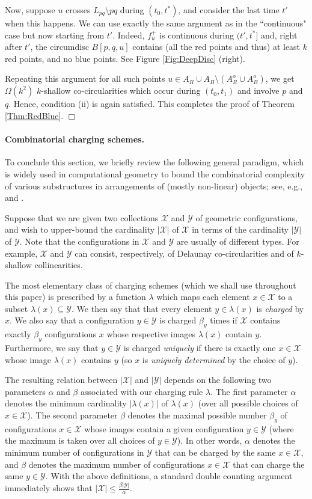 \documentclass[letter,11pt]{article}
\def \L{{L}}
\def\X{\mathcal{X}}
\def\Y{\mathcal{Y}}
\begin{document}
Now, suppose $u$ crosses $\L_{pq}\setminus pq$ during $(t_0,t^*)$, and consider the last time $t'$ when this happens.
We can use exactly the same argument as in the ``continuous" case but now starting from $t'$. Indeed, $f_u^+$ is continuous during $(t',t^*]$ and, right after $t'$, the circumdisc $B[p,q,u]$ contains (all the red points and thus) at least $k$ red points, and no blue points. See Figure \ref{Fig:DeepDisc} (right).


Repeating this argument for all such points $u\in A_R\cup A_B\setminus(A_R^o\cup A_B^o)$, we get $\Omega(k^2)$ $k$-shallow co-circularities which occur during $(t_0,t_1)$ and involve $p$ and $q$. Hence, condition (ii) is again satisfied. This completes the proof of Theorem \ref{Thm:RedBlue}. $\Box$

\paragraph{Combinatorial charging schemes.}
To conclude this section, we briefly review the following general paradigm, which is widely used in computational geometry to bound the combinatorial complexity of various substructures in arrangements of (mostly non-linear) objects; see, e.g., \cite{Envelopes3D,ConstantLines} and \cite[Section 7]{SA95}.

Suppose that we are given two collections $\X$ and $\Y$ of geometric configurations, and wish to upper-bound the cardinality $|\X|$ of $\X$ in terms of the cardinality $|\Y|$ of $\Y$.
Note that the configurations in $\X$ and $\Y$ are usually of different types. For example, $\X$ and $\Y$ can consist, respectively, of Delaunay co-circularities and of $k$-shallow collinearities.

The most elementary class of charging schemes (which we shall use throughout this paper) is prescribed by a function $\lambda$ which maps each element $x\in \X$ to a subset $\lambda(x)\subseteq \Y$. 
We then say that that every element $y\in \lambda(x)$ is {\it charged} by $x$.
We also say that a configuration $y\in \Y$ is charged $\beta_y$ times if $\X$ contains exactly $\beta_y$ configurations $x$ whose respective images $\lambda(x)$ contain $y$. Furthermore, we say that $y\in \Y$ is charged {\it uniquely} if there is exactly one $x\in \X$ whose image $\lambda(x)$ contains $y$ (so $x$ is {\it uniquely determined} by the choice of $y$).


The resulting relation between $|\X|$ and $|\Y|$ depends on the following two parameters $\alpha$ and $\beta$ associated with our charging rule $\lambda$. The first parameter $\alpha$ denotes the minimum cardinality $|\lambda(x)|$ of $\lambda(x)$ (over all possible choices of $x\in \X$).
 The second parameter $\beta$ denotes the maximal possible number $\beta_y$ of configurations $x\in \X$ whose images contain a given configuration $y\in \Y$ (where the maximum is taken over all choices of $y\in \Y$).
In other words, $\alpha$ denotes the minimum number of configurations in $\Y$ that can be charged by the same  $x\in \X$, and $\beta$ denotes the maximum number of configurations $x\in \X$ that can charge the same $y\in \Y$.
With the above definitions, a standard double counting argument immediately shows that $|\X|\leq \frac{\beta |\Y|}{\alpha}$.
\end{document}
